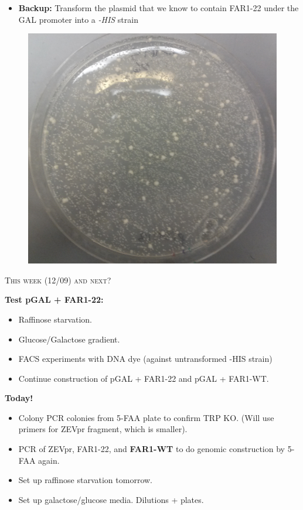 \documentclass{beamer}
\begin{document}
\begin{frame}
    \begin{itemize}
        \item \textbf{Backup:} Transform the plasmid that we know to contain FAR1-22 under the GAL promoter into a \emph{-HIS} strain
    \end{itemize}
    \begin{figure}[ht!]
        \centering
        \includegraphics[width=.6\textwidth]{HIS1206.png}
        \label{fig:faa}
    \end{figure}
\end{frame}

\begin{frame}
    \begin{center}
        {\large \textsc{This week (12/09) and next?}}
    \end{center}
    \textbf{Test pGAL + FAR1-22:}\\
    \begin{itemize}
        \item Raffinose starvation.
        \item Glucose/Galactose gradient.
        \item FACS experiments with DNA dye (against untransformed -HIS strain)
            \bigskip
        \item Continue construction of pGAL + FAR1-22 and pGAL + FAR1-WT.
    \end{itemize}
\end{frame}

\begin{frame}
    \textbf{Today!}

    \begin{itemize}
        \item Colony PCR colonies from 5-FAA plate to confirm TRP KO. (Will use primers for ZEVpr fragment, which is smaller).
            \bigskip
        \item PCR of ZEVpr, FAR1-22, and \textbf{FAR1-WT} to do genomic construction by 5-FAA again.
            \bigskip
        \item Set up raffinose starvation tomorrow.
        \item Set up galactose/glucose media. Dilutions + plates.
    \end{itemize}
\end{frame}
\end{document}
